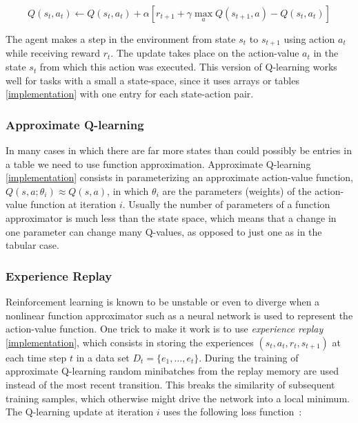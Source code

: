 \documentclass{article}
\newcommand{\GithubURL}[1]{[\href{https://github.com/davidrobles/mlnd-capstone-code/blob/master/#1}{implementation}]}
\begin{document}
\begin{equation}
Q(s_t,a_t) \gets Q(s_t,a_t) + \alpha \left[r_{t+1} + \gamma \max_a Q(s_{t+1},a) - Q(s_t,a_t)\right]
\end{equation}

The agent makes a step in the environment from state $s_t$ to $s_{t+1}$ using action $a_t$ while
receiving reward $r_t$. The update takes place on the action-value $a_t$ in the state $s_t$ from
which this action was executed. This version of Q-learning works well for tasks with a small a
state-space, since it uses arrays or tables \GithubURL{capstone/rl/value_functions/tabular.py} with
one entry for each state-action pair.

\subsubsection{Approximate Q-learning}

In many cases in which there are far more states than could possibly be entries in a table we need
to use function approximation. Approximate Q-learning
\GithubURL{capstone/rl/learners/qlearning_approx.py} consists in parameterizing an approximate
action-value function, $Q(s,a;\theta_i) \approx Q(s,a)$, in which $\theta_i$ are the parameters
(weights) of the action-value function at iteration $i$. Usually the number of parameters of a
function approximator is much less than the state space, which means that a change in one parameter
can change many Q-values, as opposed to just one as in the tabular case.

\subsubsection{Experience Replay}

Reinforcement learning is known to be unstable or even to diverge when a nonlinear function
approximator such as a neural network is used to represent the action-value function. One trick to
make it work is to use \emph{experience replay}~\citep{LIn1993ExpReplay}
\GithubURL{capstone/rl/learners/qlearning_approx.py\#L41}, which consists in storing the experiences
$(s_t, a_t, r_t, s_{t+1})$ at each time step $t$ in a data set $D_t=\{e_1,\dots,e_t\}$. During the
training of approximate Q-learning random minibatches from the replay memory are used instead of the
most recent transition. This breaks the similarity of subsequent training samples, which otherwise
might drive the network into a local minimum. The \mbox{Q-learning} update at iteration $i$ uses the
following loss function~\citep{Mnih2015AtariNature}:
\end{document}
